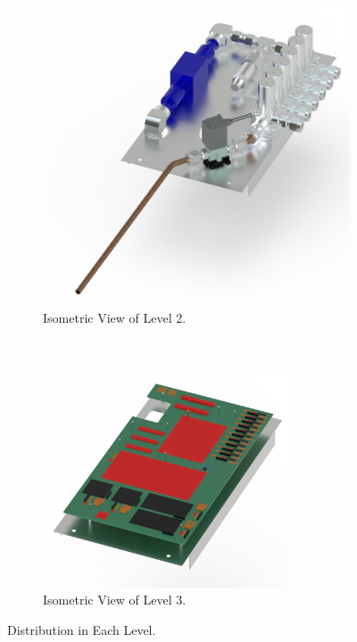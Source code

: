 \begin{figure}[H]
\begin{subfigure}[b]{0.3\textwidth}
    \includegraphics[width=\textwidth]{4-experiment-design/img/Mechanical/Figure_24b.png}
    \caption{Isometric View of Level 2.}
    \label{level_2}
    \end{subfigure}
    ~
    \begin{subfigure}[b]{0.3\textwidth}
    \centering
    \includegraphics[width=0.8\textwidth]{4-experiment-design/img/Mechanical/Figure_24c.png}
    \caption{Isometric View of Level 3.}
    \label{level_3}
    \end{subfigure}
    \caption{Distribution in Each Level.}
    \label{fig:The-brain}
\end{figure}

